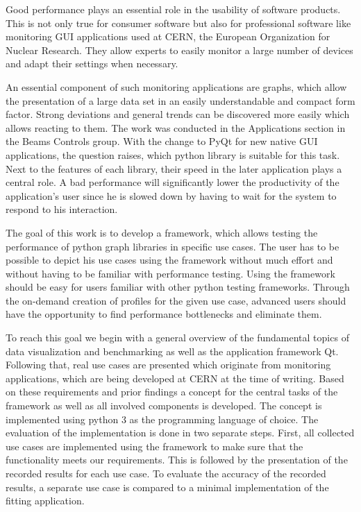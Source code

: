 

\Abstract
Good performance plays an essential role in the usability of software products.
This is not only true for consumer software but also for professional software
like monitoring GUI applications used at CERN, the European Organization for
Nuclear Research. They allow experts to easily monitor a large number of devices
and adapt their settings when necessary.

An essential component of such monitoring applications are graphs, which allow
the presentation of a large data set in an easily understandable and compact
form factor. Strong deviations and general trends can be discovered more easily
which allows reacting to them. The work was conducted in the Applications
section in the Beams Controls group. With the change to PyQt for new native GUI
applications, the question raises, which python library is suitable for this
task. Next to the features of each library, their speed in the later application
plays a central role. A bad performance will significantly lower the
productivity of the application's user since he is slowed down by having to wait
for the system to respond to his interaction.

The goal of this work is to develop a framework, which allows testing the
performance of python graph libraries in specific use cases. The user has to be
possible to depict his use cases using the framework without much effort and
without having to be familiar with performance testing. Using the framework
should be easy for users familiar with other python testing frameworks. Through
the on-demand creation of profiles for the given use case, advanced users should
have the opportunity to find performance bottlenecks and eliminate them.

To reach this goal we begin with a general overview of the fundamental topics of
data visualization and benchmarking as well as the application framework Qt.
Following that, real use cases are presented which originate from monitoring
applications, which are being developed at CERN at the time of writing. Based on
these requirements and prior findings a concept for the central tasks of the
framework as well as all involved components is developed.  The concept is
implemented using python 3 as the programming language of choice. The evaluation
of the implementation is done in two separate steps.  First, all collected use
cases are implemented using the framework to make sure that the functionality
meets our requirements. This is followed by the presentation of the recorded
results for each use case. To evaluate the accuracy of the recorded results, a
separate use case is compared to a minimal implementation of the fitting
application.
